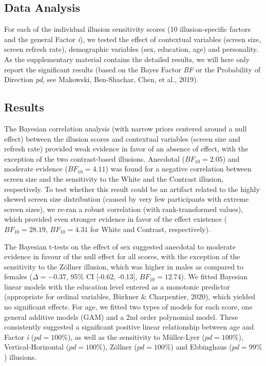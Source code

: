 \documentclass[
  man,floatsintext]{apa6}
\begin{document}
\hypertarget{data-analysis-2}{%
\subsection{Data Analysis}\label{data-analysis-2}}

For each of the individual illusion sensitivity scores (10 illusion-specific factors and the general Factor \emph{i}), we tested the effect of contextual variables (screen size, screen refresh rate), demographic variables (sex, education, age) and personality. As the supplementary material contains the detailed results, we will here only report the significant results (based on the Bayes Factor \emph{BF} or the Probability of Direction \emph{pd}, see Makowski, Ben-Shachar, Chen, et al., 2019).

\hypertarget{results-2}{%
\subsection{Results}\label{results-2}}

The Bayesian correlation analysis (with narrow priors centered around a null effect) between the illusion scores and contextual variables (screen size and refresh rate) provided weak evidence in favor of an absence of effect, with the exception of the two contrast-based illusions. Anecdotal (\(BF_{10} = 2.05\)) and moderate evidence (\(BF_{10} = 4.11\)) was found for a negative correlation between screen size and the sensitivity to the White and the Contrast illusion, respectively. To test whether this result could be an artifact related to the highly skewed screen size distribution (caused by very few participants with extreme screen sizes), we re-ran a robust correlation (with rank-transformed values), which provided even stronger evidence in favor of the effect existence (\(BF_{10} = 28.19\), \(BF_{10} = 4.31\) for White and Contrast, respectively).

The Bayesian t-tests on the effect of sex suggested anecdotal to moderate evidence in favour of the null effect for all scores, with the exception of the sensitivity to the Zöllner illusion, which was higher in males as compared to females (\(\Delta=-0.37\), 95\% CI {[}-0.62, -0.13{]}, \(BF_{10} = 12.74\)). We fitted Bayesian linear models with the education level entered as a monotonic predictor (appropriate for ordinal variables, Bürkner \& Charpentier, 2020), which yielded no significant effects. For age, we fitted two types of models for each score, one general additive models (GAM) and a 2nd order polynomial model. These consistently suggested a significant positive linear relationship between age and Factor \emph{i} (\(pd=100\%\)), as well as the sensitivity to Müller-Lyer (\(pd=100\%\)), Vertical-Horizontal (\(pd=100\%\)), Zöllner (\(pd=100\%\)) and Ebbinghaus (\(pd=99\%\)) illusions.
\end{document}
